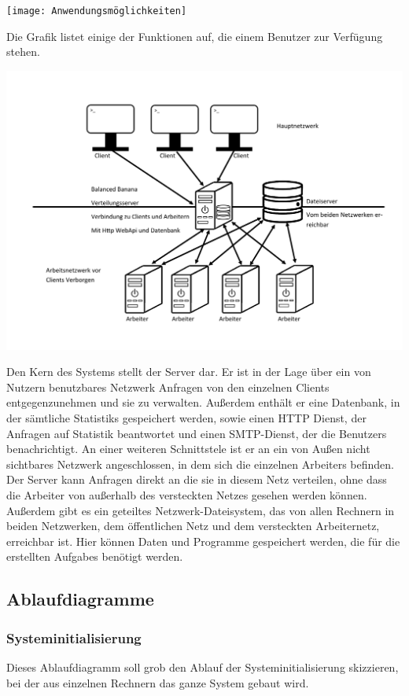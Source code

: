 \documentclass[a4paper,12pt]{article}
\begin{document}
\texttt{[image: Anwendungsmöglichkeiten]}

Die Grafik listet einige der Funktionen auf, die einem \gls{Benutzer} zur Verfügung stehen.

\includegraphics[width=\textwidth]{Systemmodelle/Systemaufbau}

Den Kern des Systems stellt der \gls{Server} dar. Er ist in der Lage über ein von Nutzern benutzbares Netzwerk Anfragen von den einzelnen \glspl{Client} entgegenzunehmen und sie zu verwalten.
Außerdem enthält er eine \gls{Datenbank}, in der sämtliche \glspl{Statistik} gespeichert werden, sowie einen HTTP Dienst, der Anfragen auf \gls{Statistik} beantwortet und einen SMTP-Dienst, der die \glspl{Benutzer} benachrichtigt. An einer weiteren \gls{Schnittstele} ist er an ein von Außen nicht sichtbares Netzwerk angeschlossen, in dem sich die einzelnen \glspl{Arbeiter} befinden. Der \gls{Server} kann Anfragen direkt an die sie in diesem Netz verteilen, ohne dass die \gls{Arbeiter} von außerhalb des versteckten Netzes gesehen werden können. Außerdem gibt es ein geteiltes Netzwerk-Dateisystem, das von allen Rechnern in beiden Netzwerken, dem öffentlichen Netz und dem versteckten Arbeiternetz, erreichbar ist. Hier können Daten und Programme gespeichert werden, die für die erstellten \glspl{Aufgabe} benötigt werden.

\subsection{Ablaufdiagramme}
\subsubsection{Systeminitialisierung}
Dieses Ablaufdiagramm soll grob den Ablauf der Systeminitialisierung skizzieren, bei der aus einzelnen Rechnern das ganze System gebaut wird.\\
\end{document}
